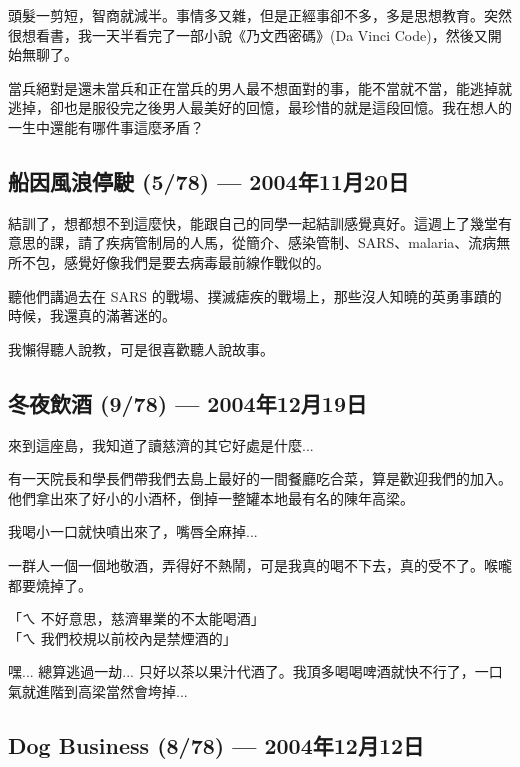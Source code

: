 \documentclass[12pt,a4paper]{article}
\newenvironment{myquote}{%
    \begin{tcolorbox}[
        colback=quote_bg,
        colframe=emergency_gray,
        boxrule=0pt,
        leftrule=3pt,
        arc=0pt,
        left=10pt,
        right=10pt,
        top=8pt,
        bottom=8pt
    ]
    \itshape
}{%
    \end{tcolorbox}
}
\begin{document}
頭髮一剪短，智商就減半。事情多又雜，但是正經事卻不多，多是思想教育。突然很想看書，我一天半看完了一部小說《乃文西密碼》(Da Vinci Code)，然後又開始無聊了。

\begin{myquote}
當兵絕對是還未當兵和正在當兵的男人最不想面對的事，能不當就不當，能逃掉就逃掉，卻也是服役完之後男人最美好的回憶，最珍惜的就是這段回憶。我在想人的一生中還能有哪件事這麼矛盾？
\end{myquote}

\subsection{船因風浪停駛 (5/78) — 2004年11月20日}

結訓了，想都想不到這麼快，能跟自己的同學一起結訓感覺真好。這週上了幾堂有意思的課，請了疾病管制局的人馬，從簡介、感染管制、SARS、malaria、流病無所不包，感覺好像我們是要去病毒最前線作戰似的。

聽他們講過去在 SARS 的戰場、撲滅瘧疾的戰場上，那些沒人知曉的英勇事蹟的時候，我還真的滿著迷的。

\begin{myquote}
我懶得聽人說教，可是很喜歡聽人說故事。
\end{myquote}

\subsection{冬夜飲酒 (9/78) — 2004年12月19日}

來到這座島，我知道了讀慈濟的其它好處是什麼...

有一天院長和學長們帶我們去島上最好的一間餐廳吃合菜，算是歡迎我們的加入。他們拿出來了好小的小酒杯，倒掉一整罐本地最有名的陳年高梁。

我喝小一口就快噴出來了，嘴唇全麻掉...

一群人一個一個地敬酒，弄得好不熱鬧，可是我真的喝不下去，真的受不了。喉嚨都要燒掉了。

\begin{myquote}
「ㄟ 不好意思，慈濟畢業的不太能喝酒」\\
「ㄟ 我們校規以前校內是禁煙酒的」
\end{myquote}

嘿... 總算逃過一劫... 只好以茶以果汁代酒了。我頂多喝喝啤酒就快不行了，一口氣就進階到高梁當然會垮掉...

\subsection{Dog Business (8/78) — 2004年12月12日}
\end{document}
